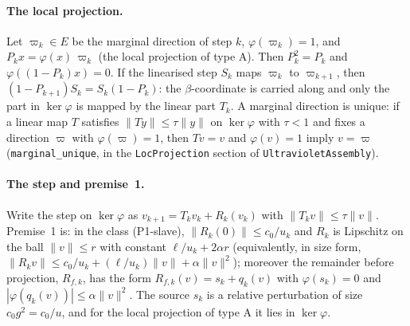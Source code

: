 \documentclass[11pt,a4paper]{article}
\theoremstyle{definition}
\theoremstyle{remark}
\newcommand{\lt}[1]{\texttt{#1}}
\begin{document}
\paragraph{The local projection.} Let $\varpi_k\in E$ be the marginal direction of step $k$, $\varphi(\varpi_k)=1$, and $P_k x=\varphi(x)\,\varpi_k$ (the local projection of type A). Then $P_k^2=P_k$ and $\varphi((1-P_k)x)=0$. If the linearised step $S_k$ maps $\varpi_k$ to $\varpi_{k+1}$, then $(1-P_{k+1})S_k=S_k(1-P_k)$: the $\beta$-coordinate is carried along and only the part in $\ker\varphi$ is mapped by the linear part $T_k$. A marginal direction is unique: if a linear map $T$ satisfies $\|Ty\|\le\tau\|y\|$ on $\ker\varphi$ with $\tau<1$ and fixes a direction $\varpi$ with $\varphi(\varpi)=1$, then $Tv=v$ and $\varphi(v)=1$ imply $v=\varpi$ (\lt{marginal\_\allowbreak{}unique}, in the \lt{LocProjection} section of \lt{UltravioletAssembly}).

\paragraph{The step and premise~1.} Write the step on $\ker\varphi$ as $v_{k+1}=T_kv_k+R_k(v_k)$ with $\|T_kv\|\le\tau\|v\|$. Premise~1 is: in the class (P1-slave), $\|R_k(0)\|\le c_0/u_k$ and $R_k$ is Lipschitz on the ball $\|v\|\le r$ with constant $\ell/u_k+2\alpha r$ (equivalently, in size form, $\|R_kv\|\le c_0/u_k+(\ell/u_k)\|v\|+\alpha\|v\|^2$); moreover the remainder before projection, $R_{f,k}$, has the form $R_{f,k}(v)=s_k+q_k(v)$ with $\varphi(s_k)=0$ and $|\varphi(q_k(v))|\le\alpha\|v\|^2$. The source $s_k$ is a relative perturbation of size $c_0g^2=c_0/u$, and for the local projection of type A it lies in $\ker\varphi$.
\end{document}

